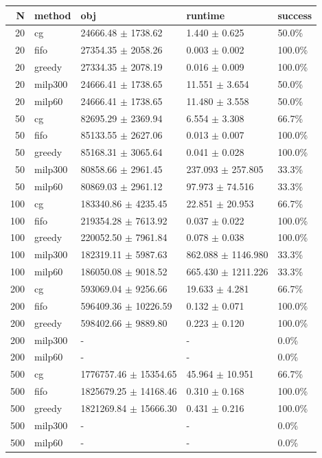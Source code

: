 \begin{tabular}{rllll}
\toprule
N & method & obj & runtime & success \\
\midrule
20 & cg & 24666.48 $\pm$ 1738.62 & 1.440 $\pm$ 0.625 & 50.0\% \\
20 & fifo & 27354.35 $\pm$ 2058.26 & 0.003 $\pm$ 0.002 & 100.0\% \\
20 & greedy & 27334.35 $\pm$ 2078.19 & 0.016 $\pm$ 0.009 & 100.0\% \\
20 & milp300 & 24666.41 $\pm$ 1738.65 & 11.551 $\pm$ 3.654 & 50.0\% \\
20 & milp60 & 24666.41 $\pm$ 1738.65 & 11.480 $\pm$ 3.558 & 50.0\% \\
50 & cg & 82695.29 $\pm$ 2369.94 & 6.554 $\pm$ 3.308 & 66.7\% \\
50 & fifo & 85133.55 $\pm$ 2627.06 & 0.013 $\pm$ 0.007 & 100.0\% \\
50 & greedy & 85168.31 $\pm$ 3065.64 & 0.041 $\pm$ 0.028 & 100.0\% \\
50 & milp300 & 80858.66 $\pm$ 2961.45 & 237.093 $\pm$ 257.805 & 33.3\% \\
50 & milp60 & 80869.03 $\pm$ 2961.12 & 97.973 $\pm$ 74.516 & 33.3\% \\
100 & cg & 183340.86 $\pm$ 4235.45 & 22.851 $\pm$ 20.953 & 66.7\% \\
100 & fifo & 219354.28 $\pm$ 7613.92 & 0.037 $\pm$ 0.022 & 100.0\% \\
100 & greedy & 220052.50 $\pm$ 7961.84 & 0.078 $\pm$ 0.038 & 100.0\% \\
100 & milp300 & 182319.11 $\pm$ 5987.63 & 862.088 $\pm$ 1146.980 & 33.3\% \\
100 & milp60 & 186050.08 $\pm$ 9018.52 & 665.430 $\pm$ 1211.226 & 33.3\% \\
200 & cg & 593069.04 $\pm$ 9256.66 & 19.633 $\pm$ 4.281 & 66.7\% \\
200 & fifo & 596409.36 $\pm$ 10226.59 & 0.132 $\pm$ 0.071 & 100.0\% \\
200 & greedy & 598402.66 $\pm$ 9889.80 & 0.223 $\pm$ 0.120 & 100.0\% \\
200 & milp300 & - & - & 0.0\% \\
200 & milp60 & - & - & 0.0\% \\
500 & cg & 1776757.46 $\pm$ 15354.65 & 45.964 $\pm$ 10.951 & 66.7\% \\
500 & fifo & 1825679.25 $\pm$ 14168.46 & 0.310 $\pm$ 0.168 & 100.0\% \\
500 & greedy & 1821269.84 $\pm$ 15666.30 & 0.431 $\pm$ 0.216 & 100.0\% \\
500 & milp300 & - & - & 0.0\% \\
500 & milp60 & - & - & 0.0\% \\
\bottomrule
\end{tabular}
